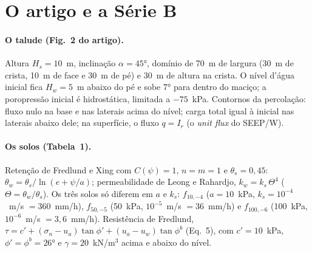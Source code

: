 \documentclass[11pt,a4paper]{article}
\begin{document}
\section{O artigo e a Série B}
\paragraph{O talude (Fig.~2 do artigo).} Altura $H_s = 10$~m, inclinação $\alpha = 45°$, domínio de 70~m de largura
(30~m de crista, 10~m de face e 30~m de pé) e 30~m de altura na crista. O nível d'água inicial fica $H_w = 5$~m abaixo do
pé e sobe 7° para dentro do maciço; a poropressão inicial é hidrostática, limitada a $-75$~kPa. Contornos da
percolação: fluxo nulo na base e nas laterais acima do nível; carga total igual à inicial nas laterais abaixo dele; na
superfície, o fluxo $q = I_r$ (o \emph{unit flux} do SEEP/W).

\paragraph{Os solos (Tabela~1).} Retenção de Fredlund e Xing com $C(\psi) = 1$, $n = m = 1$ e $\theta_s = 0{,}45$:
$\theta_w = \theta_s/\ln(e + \psi/a)$; permeabilidade de Leong e Rahardjo, $k_w = k_s\,\Theta^4$ ($\Theta =
\theta_w/\theta_s$). Os três solos só diferem em $a$ e $k_s$: $f_{10,-4}$ ($a = 10$~kPa, $k_s = 10^{-4}$~m/s $= 360$~mm/h),
$f_{50,-5}$ (50~kPa, $10^{-5}$~m/s $= 36$~mm/h) e $f_{100,-6}$ (100~kPa, $10^{-6}$~m/s $= 3{,}6$~mm/h). Resistência de
Fredlund, $\tau = c' + (\sigma_n - u_a)\tan\phi' + (u_a - u_w)\tan\phi^b$ (Eq.~5), com $c' = 10$~kPa, $\phi' = \phi^b =
26°$ e $\gamma = 20$~kN/m$^3$ acima e abaixo do nível.
\end{document}
